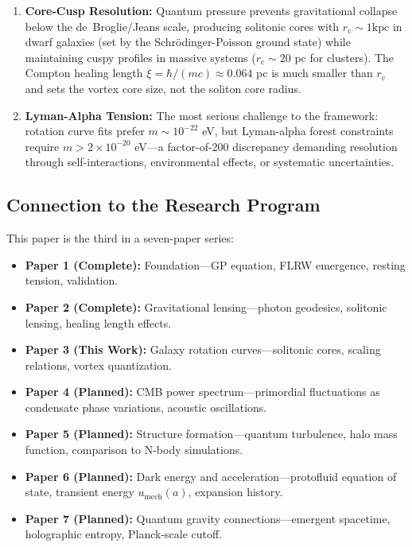 \documentclass[11pt,a4paper]{article}
\newcommand{\kpc}{\ensuremath{\mathrm{kpc}}}
\newcommand{\rc}{\ensuremath{r_{\mathrm{c}}}}
\newcommand{\umech}{\ensuremath{u_{\mathrm{mech}}}}
\theoremstyle{definition}
\theoremstyle{remark}
\begin{document}
\begin{enumerate}[leftmargin=*, itemsep=0.3em]
\item \textbf{Core-Cusp Resolution:} Quantum pressure prevents gravitational collapse below the de~Broglie/Jeans scale, producing solitonic cores with $\rc \sim 1 \kpc$ in dwarf galaxies (set by the Schr\"odinger-Poisson ground state) while maintaining cuspy profiles in massive systems ($\rc \sim 20$ pc for clusters).  The Compton healing length $\xi = \hbar/(mc) \approx 0.064$ pc is much smaller than $\rc$ and sets the vortex core size, not the soliton core radius.

\item \textbf{Lyman-Alpha Tension:} The most serious challenge to the framework: rotation curve fits prefer $m \sim 10^{-22}$ eV, but Lyman-alpha forest constraints require $m > 2 \times 10^{-20}$ eV---a factor-of-200 discrepancy demanding resolution through self-interactions, environmental effects, or systematic uncertainties.

\end{enumerate}

\subsection{Connection to the Research Program}
\label{sec:research_program}

This paper is the third in a seven-paper series:

\begin{itemize}[leftmargin=*, itemsep=0.3em]

\item \textbf{Paper 1 (Complete):} Foundation---GP equation, FLRW emergence, resting tension, validation.

\item \textbf{Paper 2 (Complete):} Gravitational lensing---photon geodesics, solitonic lensing, healing length effects.

\item \textbf{Paper 3 (This Work):} Galaxy rotation curves---solitonic cores, scaling relations, vortex quantization.

\item \textbf{Paper 4 (Planned):} CMB power spectrum---primordial fluctuations as condensate phase variations, acoustic oscillations.

\item \textbf{Paper 5 (Planned):} Structure formation---quantum turbulence, halo mass function, comparison to N-body simulations.

\item \textbf{Paper 6 (Planned):} Dark energy and acceleration---protofluid equation of state, transient energy $\umech(a)$, expansion history.

\item \textbf{Paper 7 (Planned):} Quantum gravity connections---emergent spacetime, holographic entropy, Planck-scale cutoff.

\end{itemize}
\end{document}
